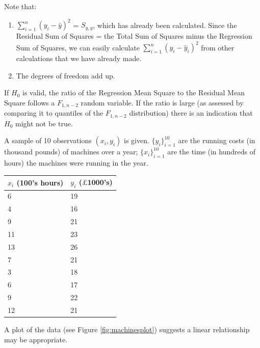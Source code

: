 \documentclass[12pt,a4paper,openany,twoside]{report}
\newenvironment{Shaded}{\begin{snugshade}}{\end{snugshade}}
\newcommand{\DataTypeTok}[1]{\textcolor[rgb]{0.13,0.29,0.53}{#1}}
\newcommand{\DecValTok}[1]{\textcolor[rgb]{0.00,0.00,0.81}{#1}}
\newcommand{\KeywordTok}[1]{\textcolor[rgb]{0.13,0.29,0.53}{\textbf{#1}}}
\newcommand{\NormalTok}[1]{#1}
\newcommand{\OperatorTok}[1]{\textcolor[rgb]{0.81,0.36,0.00}{\textbf{#1}}}
\newcommand{\StringTok}[1]{\textcolor[rgb]{0.31,0.60,0.02}{#1}}
\theoremstyle{definition}
\theoremstyle{remark}
\theoremstyle{plain}
\newcommand{\vsps}{\vspace{.5cm}}
\theoremstyle{definition}
\theoremstyle{definition}
\theoremstyle{definition}
\theoremstyle{remark}
\let\BeginKnitrBlock\begin \let\EndKnitrBlock\end
\begin{document}
Note that:

\begin{enumerate}
\def\labelenumi{\alph{enumi})}
\item
  \(\sum_{i = 1}^{n}{(y_{i} - \bar{y})}^{2}\) = \(S_{y,y}\), which has already been calculated. Since the Residual Sum of Squares = the Total Sum of Squares minus the Regression Sum of Squares, we can easily calculate \(\sum_{i = 1}^{n}{(y_{i} - {\hat{y}}_{i})}^{2}\) from other calculations that we have already made.
\item
  The degrees of freedom add up.
\end{enumerate}

If \(H_{0}\) is valid, the ratio of the Regression Mean Square to the Residual Mean Square follows a \(F_{1,n - 2}\) random variable. If the ratio is large (as assessed by comparing it to quantiles of the \(F_{1, n-2}\) distribution) there is an indication that \(H_{0}\) might not be true.\newline

\BeginKnitrBlock{example}[Machines]
\protect\hypertarget{exm:machines}{}{\label{exm:machines} {} }A sample of 10 observations \((x_i,y_i)\) is given. \(\{ y_{i}\}_{i = 1}^{10}\) are the running costs (in thousand pounds) of machines over a year; \(\{x_{i}\}_{i=1}^{10}\) are the time (in hundreds of hours) the machines were running in the year.\newline

\begin{longtable}[c]{@{}ll@{}}
\toprule
$x_i$ (100's hours) & $y_i$ ($\pounds$1000's) \tabularnewline
\midrule
\endhead
6 & 19\tabularnewline
4 & 16\tabularnewline
9 & 21\tabularnewline
11 & 23\tabularnewline
13 & 26\tabularnewline
7 & 21\tabularnewline
3 & 18\tabularnewline
6 & 17\tabularnewline
9 & 22\tabularnewline
12 & 21\tabularnewline
\bottomrule
\end{longtable}
\EndKnitrBlock{example}
\vsps

A plot of the data (see Figure \ref{fig:machinesplot}) suggests a linear relationship may be appropriate.\newline

\begin{Shaded}
\end{Shaded}
\end{document}
